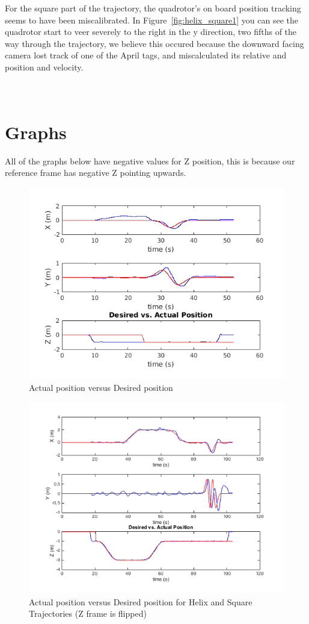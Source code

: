 \documentclass[english, twocolumn]{article}
\begin{document}
For the square part of the trajectory, the quadrotor's on board position tracking seems to have been miscalibrated. In Figure~\ref{fig:helix_square1} you can see the quadrotor start to veer severely to the right in the y direction, two fifths of the way through the trajectory, we believe this occured because the downward facing camera lost track of one of the April tags, and miscalculated its relative and position and velocity. 

\FloatBarrier
\section*{\\Graphs} \label{App:AppendixA}
All of the graphs below have negative values for Z position, this is because our reference frame has negative Z pointing upwards. 
\FloatBarrier
\begin{figure}[h!]
\includegraphics[width = \linewidth]{circle_pos.png}
\caption{Actual position versus Desired position}
\label{fig:circle_3d}
\end{figure}
\begin{figure}[h!]
\includegraphics[width = \linewidth]{helix_square_pos.png}
\caption{Actual position versus Desired position for Helix and Square Trajectories (Z frame is flipped) }
\label{fig:helix_square}
\end{figure}
\end{document}

